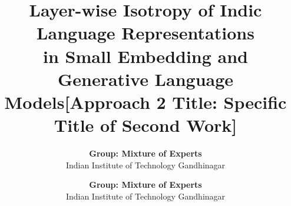 \documentclass[11pt]{article}
\makeatletter
\let\acl@maketitle\maketitle
\let\acl@@maketitle\@maketitle
\newcommand{\nextpaper}{%
  \clearpage
  \let\maketitle\acl@maketitle
  \let\@maketitle\acl@@maketitle
  \thispagestyle{empty}%
  \pagestyle{empty}%
  \setcounter{section}{0}%
  \setcounter{subsection}{0}%
  \setcounter{figure}{0}%
  \setcounter{table}{0}%
  \setcounter{equation}{0}%
}
\makeatother
\begin{document}
\title{Layer-wise Isotropy of Indic Language Representations\\in Small Embedding and Generative Language Models}

\author{
  \textbf{Group: Mixture of Experts} \\
  Indian Institute of Technology Gandhinagar
}

\maketitle









\nextpaper

\title{[Approach 2 Title: Specific Title of Second Work]}

\author{
  \textbf{Group: Mixture of Experts} \\
  Indian Institute of Technology Gandhinagar
}

\maketitle









\clearpage


\nocite{*}

\end{document}
